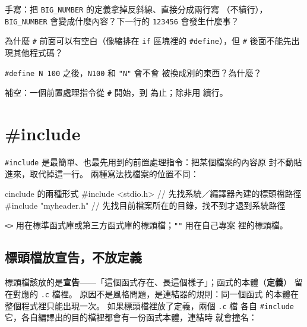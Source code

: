 
\begin{drills}[label=drills:pp-syntax]
\item 手寫：把 \texttt{BIG\_NUMBER} 的定義拿掉反斜線、直接分成兩行寫
（不續行），\texttt{BIG\_NUMBER} 會變成什麼內容？下一行的
\texttt{123456} 會發生什麼事？
\item 為什麼 \texttt{\#} 前面可以有空白（像縮排在 \texttt{if} 區塊裡的
\texttt{\#define}），但 \texttt{\#} 後面不能先出現其他程式碼？
\item \texttt{\#define N 100} 之後，\texttt{N100} 和 \texttt{"N"} 會不會
被換成別的東西？為什麼？
\item 補空：一個前置處理指令從 \texttt{\#} 開始，到 \underline{\hspace{2em}}
為止；除非用 \underline{\hspace{2em}} 續行。
\end{drills}

\section{\#include}
\label{sec:pp-include}

\texttt{\#include} 是最簡單、也最先用到的前置處理指令：把某個檔案的內容原
封不動貼進來，取代掉這一行。 兩種寫法找檔案的位置不同：

\begin{code}{c}{include 的兩種形式}
#include <stdio.h>     // 先找系統／編譯器內建的標頭檔路徑
#include "myheader.h"  // 先找目前檔案所在的目錄，找不到才退到系統路徑
\end{code}

\texttt{<>} 用在標準函式庫或第三方函式庫的標頭檔；\texttt{""} 用在自己專案
裡的標頭檔。

\subsection{標頭檔放宣告，不放定義}

標頭檔該放的是\textbf{宣告}——「這個函式存在、長這個樣子」；函式的本體（\textbf{定義}）
留在對應的 \texttt{.c} 檔裡。 原因不是風格問題，是連結器的規則：同一個函式
的本體在整個程式裡只能出現一次。 如果標頭檔裡放了定義，兩個 \texttt{.c} 檔
各自 \texttt{\#include} 它，各自編譯出的目的檔裡都會有一份函式本體，連結時
就會撞名：

